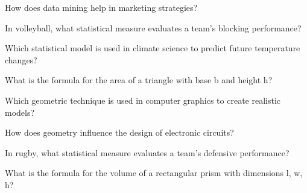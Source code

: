 \begin{enhancedmcq}{How does data mining help in marketing strategies?}
\end{enhancedmcq}

\begin{enhancedmcq}{In volleyball, what statistical measure evaluates a team's blocking performance?}
\end{enhancedmcq}

\begin{enhancedmcq}{Which statistical model is used in climate science to predict future temperature changes?}
\end{enhancedmcq}

\begin{enhancedmcq}{What is the formula for the area of a triangle with base b and height h?}
\end{enhancedmcq}

\begin{enhancedmcq}{Which geometric technique is used in computer graphics to create realistic models?}
\end{enhancedmcq}

\begin{enhancedmcq}{How does geometry influence the design of electronic circuits?}
\end{enhancedmcq}

\begin{enhancedmcq}{In rugby, what statistical measure evaluates a team's defensive performance?}
\end{enhancedmcq}

\begin{enhancedmcq}{What is the formula for the volume of a rectangular prism with dimensions l, w, h?}
\end{enhancedmcq}

